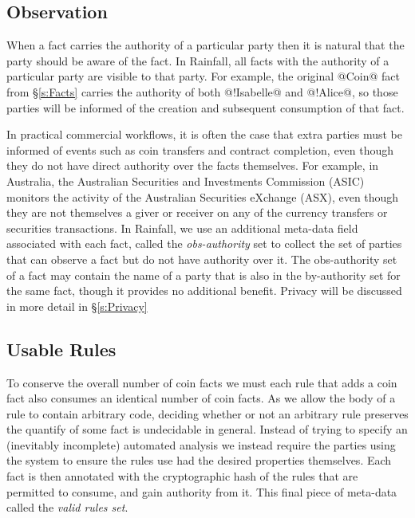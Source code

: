 \subsection{Observation}
\label{s:Observation}
When a fact carries the authority of a particular party then it is natural that the party should be aware of the fact. In Rainfall, all facts with the authority of a particular party are visible to that party. For example, the original @Coin@ fact from \S\ref{s:Facts} carries the authority of both @!Isabelle@ and @!Alice@, so those parties will be informed of the creation and subsequent consumption of that fact.

In practical commercial workflows, it is often the case that extra parties must be informed of events such as coin transfers and contract completion, even though they do not have direct authority over the facts themselves. For example, in Australia, the Australian Securities and Investments Commission (ASIC) monitors the activity of the Australian Securities eXchange (ASX), even though they are not themselves a giver or receiver on any of the currency transfers or securities transactions. In Rainfall, we use an additional meta-data field associated with each fact, called the \emph{obs-authority} set to collect the set of parties that can observe a fact but do not have authority over it. The obs-authority set of a fact may contain the name of a party that is also in the by-authority set for the same fact, though it provides no additional benefit. Privacy will be discussed in more detail in \S\ref{s:Privacy}


\subsection{Usable Rules}
To conserve the overall number of coin facts we must each rule that adds a coin fact also consumes an identical number of coin facts. As we allow the body of a rule to contain arbitrary code, deciding whether or not an arbitrary rule preserves the quantify of some fact is undecidable in general. Instead of trying to specify an (inevitably incomplete) automated analysis we instead require the parties using the system to ensure the rules use had the desired properties themselves. Each fact is then annotated with the cryptographic hash of the rules that are permitted to consume, and gain authority from it. This final piece of meta-data called the \emph{valid rules set}.


